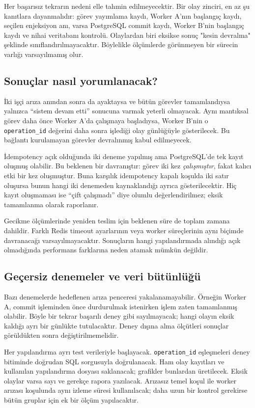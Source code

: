 \documentclass[conference,a4paper]{IEEEtran}
\newcommand{\code}[1]{\texttt{#1}}
\begin{document}
Her başarısız tekrarın nedeni elle tahmin edilmeyecektir. Bir olay zinciri, en az şu kanıtlara dayanmalıdır: görev yayımlama kaydı, Worker A'nın başlangıç kaydı, seçilen enjeksiyon anı, varsa PostgreSQL commit kaydı, Worker B'nin başlangıç kaydı ve nihai veritabanı kontrolü. Olaylardan biri eksikse sonuç "kesin devralma" şeklinde sınıflandırılmayacaktır. Böylelikle ölçümlerde görünmeyen bir sürecin varlığı varsayılmamış olur.

\subsection{Sonuçlar nasıl yorumlanacak?}
İki işçi arıza anından sonra da ayaktaysa ve bütün görevler tamamlandıysa yalnızca ``sistem devam etti'' sonucuna varmak yeterli olmayacak. Aynı mantıksal görev daha önce Worker A'da çalışmaya başladıysa, Worker B'nin o \code{operation\_id} değerini daha sonra işlediği olay günlüğüyle gösterilecek. Bu bağlantı kurulamayan görevler devralınmış kabul edilmeyecek.

İdempotency açık olduğunda iki deneme yapılmış ama PostgreSQL'de tek kayıt oluşmuş olabilir. Bu beklenen bir davranıştır: görev iki kez \emph{çalışmıştır}, fakat kalıcı etki bir kez oluşmuştur. Buna karşılık idempotency kapalı koşulda iki satır oluşursa bunun hangi iki denemeden kaynaklandığı ayrıca gösterilecektir. Hiç kayıt oluşmaması ise ``çift çalışmadı'' diye olumlu değerlendirilmez; eksik tamamlanma olarak raporlanır.

Gecikme ölçümlerinde yeniden teslim için beklenen süre de toplam zamana dahildir. Farklı Redis timeout ayarlarının veya worker süreçlerinin aynı biçimde davranacağı varsayılmayacaktır. Sonuçların hangi yapılandırmada alındığı açık olmadığında performans farklarına neden atamak mümkün değildir.

\subsection{Geçersiz denemeler ve veri bütünlüğü}
Bazı denemelerde hedeflenen arıza penceresi yakalanamayabilir. Örneğin Worker A, commit işleminden önce durdurulmak istenirken işlem zaten tamamlanmış olabilir. Böyle bir tekrar başarılı deney gibi sayılmayacak; hangi olayın eksik kaldığı ayrı bir günlükte tutulacaktır. Deney dışına alma ölçütleri sonuçlar görüldükten sonra değiştirilmemelidir.

Her yapılandırma ayrı test verileriyle başlayacak. \code{operation\_id} eşleşmeleri deney bitiminde doğrudan SQL sorgusuyla doğrulanacak. Ham olay kayıtları ve kullanılan yapılandırma dosyası saklanacak; grafikler bunlardan üretilecek. Eksik olaylar varsa sayı ve gerekçe rapora yazılacak. Arızasız temel koşul ile worker arızası koşulunda aynı izleme süresi kullanılacak; daha uzun bir kontrol gerekirse bütün gruplar için ek bir ölçüm yapılacaktır.
\end{document}
